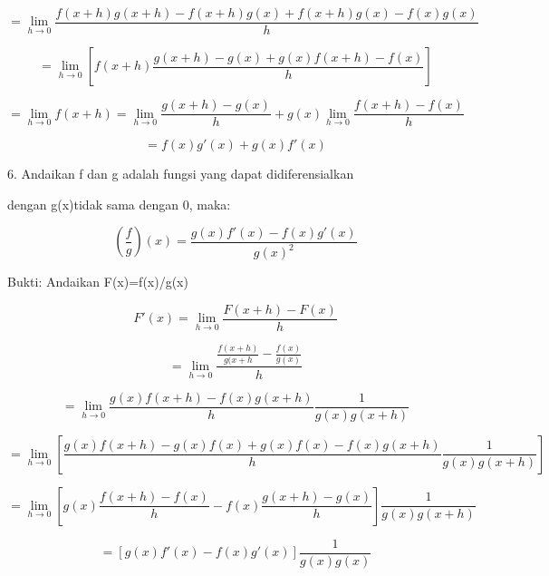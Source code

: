 \documentclass[a4paper,10pt]{article}
\begin{document}
\begin{eulernotebook}
\begin{eulercomment}
\begin{eulercomment}
\begin{eulerformula}
\[\]
\end{eulerformula}
\begin{eulerformula}
\[
= \lim_{h\to 0}\frac{f(x+h)g(x+h)-f(x+h)g(x)+f(x+h)g(x)-f(x)g(x)}{h}
\]
\end{eulerformula}
\begin{eulerformula}
\[
=\lim_{h\to 0}[f(x+h)\frac{g(x+h)-g(x)+g(x)f(x+h)-f(x)}{h}]
\]
\end{eulerformula}
\begin{eulerformula}
\[
=\lim_{h\to 0} f(x+h)=\lim_{h \to 0}\frac{g(x+h)-g(x)}{h}+g(x)\lim_{h\to 0}\frac{f(x+h)-f(x)}{h}
\]
\end{eulerformula}
\begin{eulerformula}
\[
=f(x)g'(x)+g(x)f'(x)
\]
\end{eulerformula}
\begin{eulercomment}
6. Andaikan f dan g adalah fungsi yang dapat didiferensialkan\\
\end{eulercomment}
\begin{eulerttcomment}
   dengan g(x)tidak sama dengan 0, maka:
\end{eulerttcomment}
\begin{eulerformula}
\[
(\frac{f}{g})(x)=\frac{g(x)f'(x)-f(x)g'(x)}{g(x)^2}
\]
\end{eulerformula}
\begin{eulerttcomment}
   Bukti:
   Andaikan F(x)=f(x)/g(x)
\end{eulerttcomment}
\begin{eulerformula}
\[
F'(x)= \lim_{h\to 0}\frac{F(x+h)-F(x)}{h}
\]
\end{eulerformula}
\begin{eulerformula}
\[
= \lim_{h\to 0}\frac{\frac{f(x+h)}{g(x+h}-\frac{f(x)}{g(x)}}{h}
\]
\end{eulerformula}
\begin{eulerformula}
\[
= \lim_{h\to 0}\frac{g(x)f(x+h)-f(x)g(x+h)}{h}\frac{1}{g(x)g(x+h)}
\]
\end{eulerformula}
\begin{eulerformula}
\[
= \lim_{h\to 0}[\frac{g(x)f(x+h)-g(x)f(x)+g(x)f(x)-f(x)g(x+h)}{h}\frac{1}{g(x)g(x+h)}]
\]
\end{eulerformula}
\begin{eulerformula}
\[
=\lim_{h\to 0} [g(x)\frac{f(x+h)-f(x)}{h}-f(x)\frac{g(x+h)-g(x)}{h}]\frac{1}{g(x)g(x+h)}
\]
\end{eulerformula}
\begin{eulerformula}
\[
=[g(x)f'(x)-f(x)g'(x)]\frac{1}{g(x)g(x)}
\]
\end{eulerformula}
\end{eulercomment}
\end{eulercomment}
\end{eulernotebook}
\end{document}
